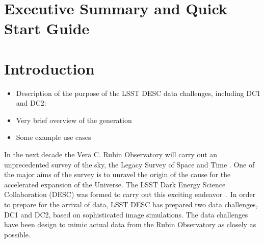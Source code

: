 \documentclass[11pt]{report}
\begin{document}
\setlength\parindent{0em}
\setlength{\parskip}{0.5em}



\renewcommand{\thepage}{\arabic{page}}
\setcounter{page}{1}

\renewcommand\thefigure{\arabic{figure}}
\setcounter{figure}{0}


\section*{Executive Summary and Quick Start Guide}




\section{Introduction}


\begin{itemize}
\item Description of the purpose of the LSST DESC data challenges, including DC1 and DC2:
\item Very brief overview of the generation
\item Some example use cases
\end{itemize}

In the next decade the Vera C. Rubin Observatory will carry out an unprecedented survey of the sky, the Legacy Survey of Space and Time \citep{2009arXiv0912.0201L}. One of the major aims of the survey is to unravel the origin of the cause for the accelerated expansion of the Universe. The LSST Dark Energy Science Collaboration (DESC) was formed to carry out this exciting endeavor~\citep{Abate:2012za}. In order to prepare for the arrival of data, LSST DESC has prepared two data challenges, DC1 and DC2, based on sophisticated image simulations. The data challenges have been design to mimic actual data from the Rubin Observatory as closely as possible. 
\end{document}
